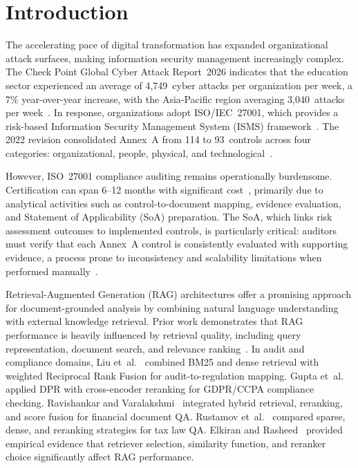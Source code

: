 \documentclass[conference]{IEEEtran}
\begin{document}
\section{Introduction}

The accelerating pace of digital transformation has expanded organizational
attack surfaces, making information security management increasingly complex.
The Check Point Global Cyber Attack Report~2026 indicates that the education
sector experienced an average of 4,749~cyber attacks per organization per
week, a 7\% year-over-year increase, with the Asia-Pacific region averaging
3,040~attacks per week~\cite{checkpoint2026}. In response, organizations
adopt ISO/IEC~27001, which provides a risk-based Information Security
Management System (ISMS) framework~\cite{calder2023iso27001,isoiec20227001}.
The 2022 revision consolidated Annex~A from 114 to 93~controls across four
categories: organizational, people, physical, and
technological~\cite{calder2023iso27001}.

However, ISO~27001 compliance auditing remains operationally burdensome.
Certification can span 6--12 months with significant cost~\cite{marques2024automating},
primarily due to analytical activities such as control-to-document mapping,
evidence evaluation, and Statement of Applicability (SoA) preparation.
The SoA, which links risk assessment outcomes to implemented controls, is
particularly critical: auditors must verify that each Annex~A control is
consistently evaluated with supporting evidence, a process prone to
inconsistency and scalability limitations when performed manually~\cite{csam2024}.

Retrieval-Augmented Generation (RAG) architectures offer a promising
approach for document-grounded analysis by combining natural language
understanding with external knowledge retrieval. Prior work demonstrates
that RAG performance is heavily influenced by retrieval quality, including
query representation, document search, and relevance
ranking~\cite{gupta2025compliance,lajbr2025,auditgpt2025,reguquery2025}.
In audit and compliance domains, Liu et~al.~\cite{lajbr2025} combined BM25
and dense retrieval with weighted Reciprocal Rank Fusion for audit-to-regulation
mapping. Gupta et~al.~\cite{gupta2025compliance} applied DPR with
cross-encoder reranking for GDPR/CCPA compliance checking. Ravishankar and
Varalakshmi~\cite{ravishankar2025hybrid} integrated hybrid retrieval,
reranking, and score fusion for financial document QA. Rustamov
et~al.~\cite{rustamov2025tax} compared sparse, dense, and reranking
strategies for tax law QA. Elkiran and Rasheed~\cite{elkiran2026empirical}
provided empirical evidence that retriever selection, similarity function,
and reranker choice significantly affect RAG performance.
\end{document}
